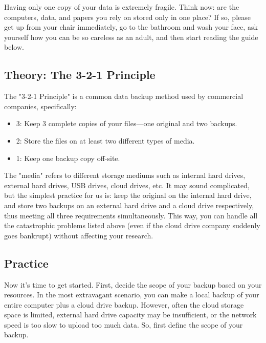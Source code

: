 Having only one copy of your data is extremely fragile. Think now: are the computers, data, and papers you rely on stored only in one place? If so, please get up from your chair immediately, go to the bathroom and wash your face, ask yourself how you can be so careless as an adult, and then start reading the guide below.

\subsection{Theory: The 3-2-1 Principle}

The "3-2-1 Principle" is a common data backup method used by commercial companies, specifically:
\begin{itemize}
    \item 3: Keep 3 complete copies of your files—one original and two backups.
    \item 2: Store the files on at least two different types of media.
    \item 1: Keep one backup copy off-site.
\end{itemize}

The "media" refers to different storage mediums such as internal hard drives, external hard drives, USB drives, cloud drives, etc. It may sound complicated, but the simplest practice for us is: keep the original on the internal hard drive, and store two backups on an external hard drive and a cloud drive respectively, thus meeting all three requirements simultaneously. This way, you can handle all the catastrophic problems listed above (even if the cloud drive company suddenly goes bankrupt) without affecting your research.

\subsection{Practice}

Now it's time to get started. First, decide the scope of your backup based on your resources. In the most extravagant scenario, you can make a local backup of your entire computer plus a cloud drive backup. However, often the cloud storage space is limited, external hard drive capacity may be insufficient, or the network speed is too slow to upload too much data. So, first define the scope of your backup.

